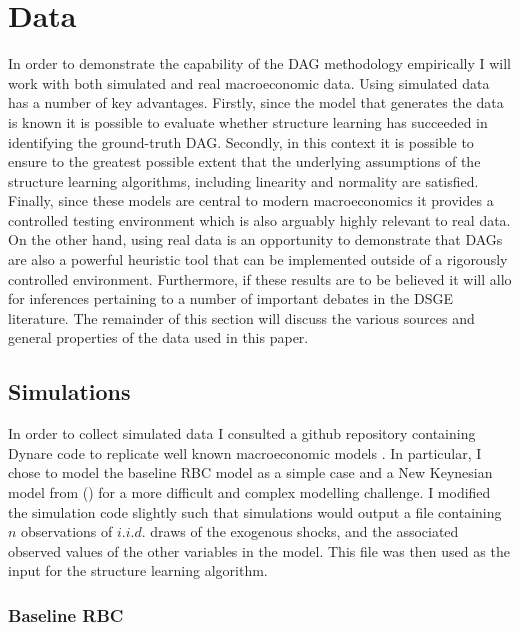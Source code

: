\documentclass{article}
\begin{document}
\section{Data} \label{data}

In order to demonstrate the capability of the DAG methodology empirically I will work with both simulated and real macroeconomic data. Using simulated data has a number of key advantages. Firstly, since the model that generates the data is known it is possible to evaluate whether structure learning has succeeded in identifying the ground-truth DAG. Secondly, in this context it is possible to ensure to the greatest possible extent that the underlying assumptions of the structure learning algorithms, including linearity and normality are satisfied. Finally, since these models are central to modern macroeconomics it provides a controlled testing environment which is also arguably highly relevant to real data. On the other hand, using real data is an opportunity to demonstrate that DAGs are also a powerful heuristic tool that can be implemented outside of a rigorously controlled environment. Furthermore, if these results are to be believed it will allo for inferences pertaining to a number of important debates in the DSGE literature. The remainder of this section will discuss the various sources and general properties of the data used in this paper.

\subsection{Simulations}

In order to collect simulated data I consulted a github repository containing Dynare code to replicate well known macroeconomic models \parencite{pfeifer2020}. In particular, I chose to model the baseline RBC model as a simple case and a New Keynesian model from \citeauthor{gali2015monetary} (\citeyear{gali2015monetary}) for a more difficult and complex modelling challenge. I modified the simulation code slightly such that simulations would output a file containing $n$ observations of $i.i.d.$ draws of the exogenous shocks, and the associated observed values of the other variables in the model. This file was then used as the input for the structure learning algorithm.

\subsubsection{Baseline RBC}
\end{document}
